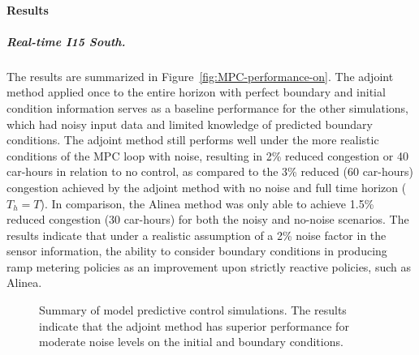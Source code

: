 								\paragraph{Results}
																
								\subparagraph{Real-time I15 South.}
																
								The results are summarized in Figure~\ref{fig:MPC-performance-on}.
								The adjoint method applied once to the entire horizon with perfect
								boundary and initial condition information serves as a baseline performance
								for the other simulations, which had noisy input data and limited
								knowledge of predicted boundary conditions. The adjoint method still
								performs well under the more realistic conditions of the MPC loop
								with noise, resulting in 2\% reduced congestion or 40 car-hours in relation to no control, as compared to the 3\% reduced (60 car-hours) congestion achieved by the adjoint method with no noise and full time horizon ($T_h=T$). In comparison, the Alinea method was only able to achieve 1.5\% reduced congestion (30 car-hours) for both the noisy and no-noise scenarios. The results indicate
								that under a realistic assumption of a 2\% noise factor in the sensor
								information, the ability to consider boundary conditions in producing
								ramp metering policies as an improvement upon strictly reactive policies,
								such as Alinea.
																
								\begin{figure}
									\hfill{}
									\caption{Summary of model predictive control simulations. The results indicate that the adjoint method has superior performance for moderate noise levels on the initial and boundary conditions.}
								\end{figure}
																
